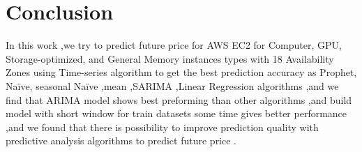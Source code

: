 \documentclass[graybox]{svmult}
\begin{document}
\section{Conclusion}
In this work ,we try to predict future price for AWS EC2 for Computer, GPU, Storage-optimized, and General Memory instances types with 18 Availability Zones using Time-series algorithm to get the best prediction accuracy as Prophet, Naïve, seasonal Naïve ,mean ,SARIMA ,Linear Regression algorithms ,and we find that ARIMA model shows best preforming than other algorithms ,and build model with short window for train datasets some time gives better performance ,and we found that there is possibility to improve prediction quality with predictive analysis algorithms to predict future price .


\end{document}
